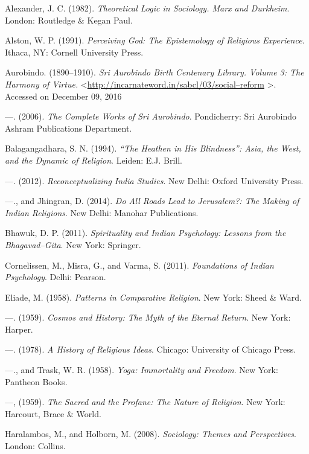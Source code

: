 \begin{thebibliography}{99}
 Alexander, J. C. (1982). \textit{Theoretical Logic in Sociology. Marx and Durkheim}. London: Routledge \& Kegan Paul.

  Alston, W. P. (1991). \textit{Perceiving God: The Epistemology of Religious Experience}. Ithaca, NY: Cornell University Press.

  Aurobindo. (1890–1910). \textit{Sri Aurobindo Birth Centenary Library. Volume 3: The Harmony of Virtue.} \textless  \url{http://incarnateword.in/sabcl/03/social–reform} \textgreater . Accessed on December 09, 2016

  —. (2006). \textit{The Complete Works of Sri Aurobindo}. Pondicherry: Sri Aurobindo Ashram Publications Department.

  Balagangadhara, S. N. (1994). \textit{“The Heathen in His Blindness”: Asia, the West, and the Dynamic of Religion}. Leiden: E.J. Brill.

  —. (2012). \textit{Reconceptualizing India Studies}. New Delhi: Oxford University Press.

  —., and Jhingran, D. (2014). \textit{Do All Roads Lead to Jerusalem?: The Making of Indian Religions}. New Delhi: Manohar Publications.

  Bhawuk, D. P. (2011). \textit{Spirituality and Indian Psychology: Lessons from the Bhagavad–Gita}. New York: Springer.

  Cornelissen, M., Misra, G., and Varma, S. (2011). \textit{Foundations of Indian Psychology}. Delhi: Pearson.

  Eliade, M. (1958). \textit{Patterns in Comparative Religion}. New York: Sheed \& Ward.

  —. (1959). \textit{Cosmos and History: The Myth of the Eternal Return}. New York: Harper.

  —. (1978). \textit{A History of Religious Ideas}. Chicago: University of Chicago Press.

  —., and Trask, W. R. (1958). \textit{Yoga: Immortality and Freedom}. New York: Pantheon Books.

  —, (1959). \textit{The Sacred and the Profane: The Nature of Religion}. New York: Harcourt, Brace \& World.

  Haralambos, M., and Holborn, M. (2008). \textit{Sociology: Themes and Perspectives}. London: Collins.


\end{thebibliography}
